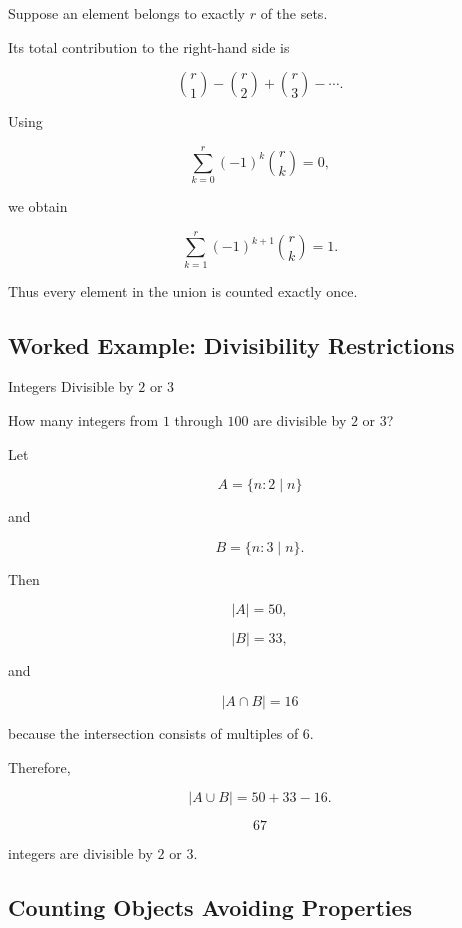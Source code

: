 Suppose an element belongs to exactly \(r\) of the sets.

Its total contribution to the right-hand side is

\[
\binom{r}{1}
-
\binom{r}{2}
+
\binom{r}{3}
-\cdots.
\]

Using

\[
\sum_{k=0}^{r}
(-1)^k\binom{r}{k}
=
0,
\]

we obtain

\[
\sum_{k=1}^{r}
(-1)^{k+1}\binom{r}{k}
=
1.
\]

Thus every element in the union is counted exactly once.

\subsection{Worked Example: Divisibility Restrictions}
\label{subsec:worked-inclusion-exclusion}

\begin{workedexamplebox}{Integers Divisible by \(2\) or \(3\)}

How many integers from \(1\) through \(100\) are divisible by \(2\) or
\(3\)?

Let

\[
A=\{n:2\mid n\}
\]

and

\[
B=\{n:3\mid n\}.
\]

Then

\[
|A|=50,
\]

\[
|B|=33,
\]

and

\[
|A\cap B|=16
\]

because the intersection consists of multiples of \(6\).

Therefore,

\[
|A\cup B|
=
50+33-16.
\]

\begin{answerbox}
\[
\boxed{
67
}
\]

integers are divisible by \(2\) or \(3\).
\end{answerbox}

\end{workedexamplebox}

\subsection{Counting Objects Avoiding Properties}
\label{subsec:counting-avoiding-properties}

